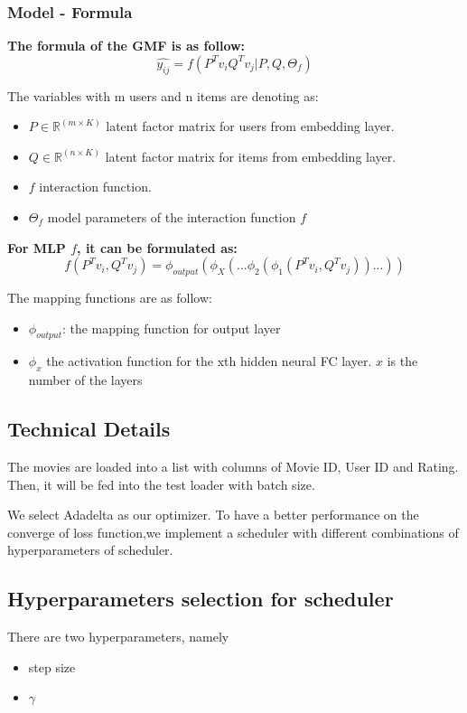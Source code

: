 \documentclass[final]{cvpr}
\begin{document}
\subsubsection{Model - Formula}
\bigskip
\textbf{ The formula of the GMF is as follow:}
$$\hat{y_{ij}} = f(P^T v_i Q^T v_j|P,Q,\Theta_f)$$

The variables with m users and n items are denoting as:
\begin{itemize}
    \item $P \in \mathbb{R}^{(m \times K)}$ latent factor matrix for users from embedding layer.
    \item $Q \in \mathbb{R} ^{(n \times K)}$ latent factor matrix for items from embedding layer.
    \item $f$ interaction function.    
    \item $\Theta_{f}$ model parameters of the interaction function $f$
\end{itemize}

\bigskip
\textbf{ For MLP $f$, it can be formulated as:}
$$f(P^T v_i, Q^T v_j) = \phi_{output}(\phi_X(...\phi_2(\phi_1(P^T v_i, Q^T v_j))...))$$

The mapping functions are as follow:
\begin{itemize}
    \item $\phi_{output}$: the mapping function for output layer
    \item $\phi_x$ the activation function for the xth hidden neural FC layer. $x$ is the number of the layers
\end{itemize}

\subsection{Technical Details}

The movies are loaded into a list with columns of Movie ID, User ID and Rating. Then, it will be fed into the test loader with batch size.

We select Adadelta as our optimizer. 
To have a better performance on the converge of loss function,we implement a scheduler with different combinations of hyperparameters of scheduler.

\subsection{Hyperparameters selection for scheduler}
There are two hyperparameters, namely
\begin{itemize}
    \item step size
    \item $\gamma$
\end{itemize}
\end{document}
